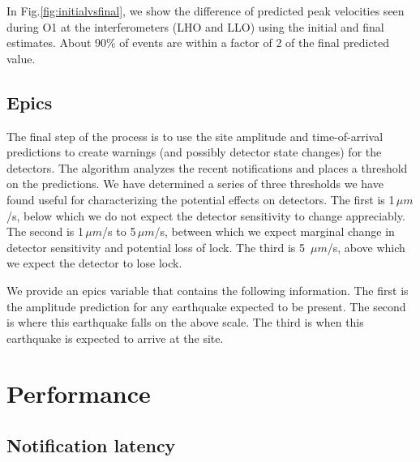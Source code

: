 \documentclass[reprint, prl, aps, showpacs]{revtex4-1}
\begin{document}
In Fig.\ref{fig:initialvsfinal}, we show the difference of predicted peak velocities seen during O1 at the interferometers (LHO and LLO) using the initial and final estimates. About 90\% of events are within a factor of 2 of the final predicted value.

\subsection{Epics}

The final step of the process is to use the site amplitude and time-of-arrival predictions to create warnings (and possibly detector state changes) for the detectors.
The algorithm analyzes the recent notifications and places a threshold on the predictions.
We have determined a series of three thresholds we have found useful for characterizing the potential effects on detectors.
The first is 1\,$\mu m$/s, below which we do not expect the detector sensitivity to change appreciably.
The second is 1\,$\mu m$/s to 5\,$\mu m$/s, between which we expect marginal change in detector sensitivity and potential loss of lock.
The third is 5 \,$\mu m$/s, above which we expect the detector to lose lock.

We provide an epics variable that contains the following information.
The first is the amplitude prediction for any earthquake expected to be present.
The second is where this earthquake falls on the above scale.
The third is when this earthquake is expected to arrive at the site.

\section{Performance}
\label{sec:performance}

\subsection{Notification latency}
\end{document}
